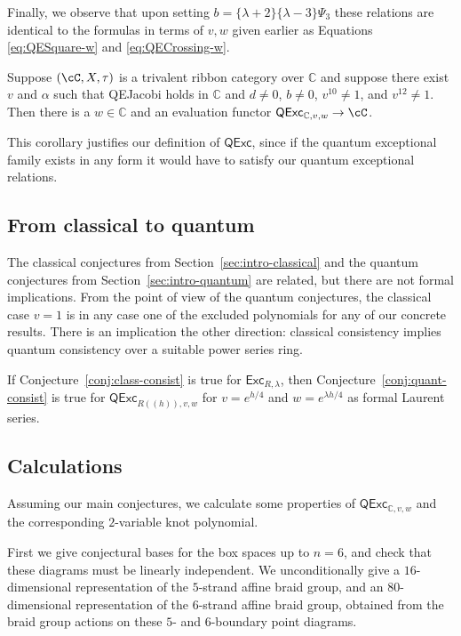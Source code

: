 \documentclass[12pt]{amsart}
\begin{document}
Finally, we observe that upon setting $b =
\{\lambda+2\}\{\lambda-3\}\Psi_3$ these relations are identical to
the formulas in terms of $v,w$ given earlier as Equations
\eqref{eq:QESquare-w} and \eqref{eq:QECrossing-w}.

\begin{corollary}
Suppose $(\cC, X, \tau)$ is a trivalent ribbon category over $\mathbb{C}$ and
suppose there exist $v$ and $\alpha$ such that QEJacobi holds in $\mathbb{C}$
and $d \neq 0 $, $b \neq 0$, $v^{10} \neq 1$, and $v^{12} \neq 1$.  Then there
is a $w \in \mathbb{C}$ and an evaluation functor
$\mathsf{QExc}_{\mathbb{C},v,w} \rightarrow \cC$.
\end{corollary}

This corollary justifies our definition of $\mathsf{QExc}$, since if the
quantum exceptional family exists in any form it would have to satisfy our
quantum exceptional relations.

\subsection{From classical to quantum}
The classical conjectures from Section~\ref{sec:intro-classical} and
the quantum conjectures from Section~\ref{sec:intro-quantum} are
related, but there are not formal implications. From the point of view
of the quantum conjectures, the classical case $v=1$ is in any case
one of the excluded polynomials for any of our concrete results. There
is an implication the other direction: classical consistency implies
quantum consistency over a suitable power series ring.
\begin{theorem}\label{thm:classical-quantum}
  If Conjecture~\ref{conj:class-consist} is true
  for $\mathsf{Exc}_{R,\lambda}$, then
  Conjecture~\ref{conj:quant-consist} is true for
  $\mathsf{QExc}_{R((h)),v,w}$ for $v=e^{h/4}$ and $w=e^{\lambda
    h/4}$ as formal Laurent series.
\end{theorem}


\subsection{Calculations}


Assuming our main conjectures, we calculate some properties of
$\mathsf{QExc}_{\mathbb{C},v,w}$ and the corresponding $2$-variable knot
polynomial.

First we give conjectural bases for the box spaces up to $n=6$, and check that
these diagrams must be linearly independent.  We unconditionally give a
$16$-dimensional representation of the $5$-strand affine braid group, and an
$80$-dimensional representation of the $6$-strand affine braid group, obtained
from the braid group actions on these $5$- and $6$-boundary point diagrams.
\end{document}

